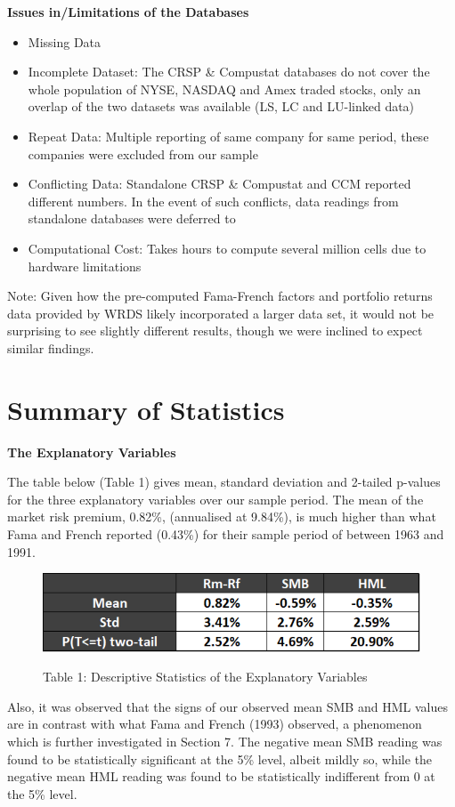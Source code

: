 \documentclass[12pt]{article}
\begin{document}
\noindent \textbf{Issues in/Limitations of the Databases}
\begin{itemize}
	\item Missing Data
	\item Incomplete Dataset: The CRSP \& Compustat databases do not cover the whole population of NYSE, NASDAQ and Amex traded stocks, only an overlap of the two datasets was available (LS, LC and LU-linked data)
	\item Repeat Data: Multiple reporting of same company for same period, these companies were excluded from our sample
	\item Conflicting Data: Standalone CRSP \& Compustat and CCM reported different numbers. In the event of such conflicts, data readings from standalone databases were deferred to
	\item Computational Cost: Takes hours to compute several million cells due to hardware limitations
\end{itemize}
\noindent Note: Given how the pre-computed Fama-French factors and portfolio returns data provided by WRDS likely incorporated a larger data set, it would not be surprising to see slightly different results, though we were inclined to expect similar findings. 

\newpage

\section{Summary of Statistics}
\textbf{The Explanatory Variables}

\noindent The table below (Table 1) gives mean, standard deviation and 2-tailed p-values for the three explanatory variables over our sample period. The mean of the market risk premium, 0.82\%, (annualised at 9.84\%), is much higher than what Fama and French reported (0.43\%) for their sample period of between 1963 and 1991. 


\begin{figure}[h]
	\centering
	\caption*{Table 1: Descriptive Statistics of the Explanatory Variables}
	\includegraphics[width=0.45\linewidth]{A1.png}
	\label{fig:label}
\end{figure}

\noindent Also, it was observed that the signs of our observed mean SMB and HML values are in contrast with what Fama and French (1993) observed, a phenomenon which is further investigated in Section 7. The negative mean SMB reading was found to be statistically significant at the 5\% level, albeit mildly so, while the negative  mean HML reading was found to be statistically indifferent from 0 at the 5\% level. 
\end{document}
